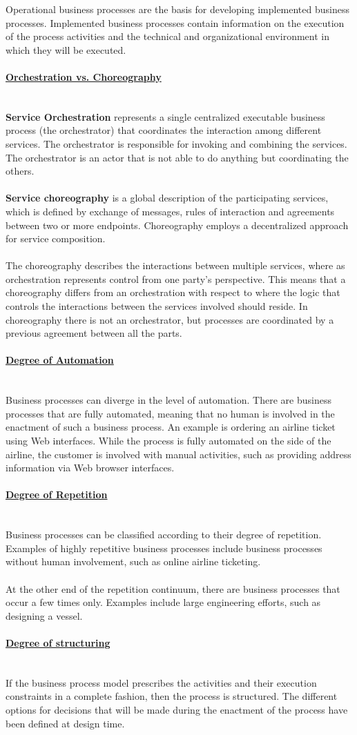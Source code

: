 \documentclass[10pt,a4paper]{article}
\newcommand{\myparagraph}[1]{\paragraph{\uline{#1}}\mbox{}\\[0.05in]}
\begin{document}
Operational business processes are the basis for developing implemented business processes. Implemented business processes contain information on the execution of the process activities and the technical and organizational environment in which they will be executed.
\myparagraph{Orchestration vs. Choreography}
\textbf{Service Orchestration} represents a single centralized executable business process (the orchestrator) that coordinates the interaction among different services. The orchestrator is responsible for invoking and combining the services. The orchestrator is an actor that is not able to do anything but coordinating the others. \\ \\
\textbf{Service choreography} is a global description of the participating services, which is defined by exchange of messages, rules of interaction and agreements between two or more endpoints. Choreography employs a decentralized approach for service composition.
\\ \\
The choreography describes the interactions between multiple services, where as orchestration represents control from one party's perspective. This means that a choreography differs from an orchestration with respect to where the logic that controls the interactions between the services involved should reside. In choreography there is not an orchestrator, but processes are coordinated by a previous agreement between all the parts.
\myparagraph{Degree of Automation}
Business processes can diverge in the level of automation. There are business processes that are fully automated, meaning that no human is involved in the enactment of such a business process. An example is ordering an airline ticket using Web interfaces. While the process is fully automated on the side of the airline, the customer is involved with manual activities, such as providing address information via Web browser interfaces.
\myparagraph{Degree of Repetition}
Business processes can be classified according to their degree of repetition. Examples of highly repetitive business processes include business processes without human involvement, such as online airline ticketing.  \\ \\
At the other end of the repetition continuum, there are business processes that occur a few times only. Examples include large engineering efforts, such as designing a vessel. 
\myparagraph{Degree of structuring}
If the business process model prescribes the activities and their execution constraints in a complete fashion, then the process is structured. The different options for decisions that will be made during the enactment of the process have been defined at design time.  \\ \\
\end{document}
